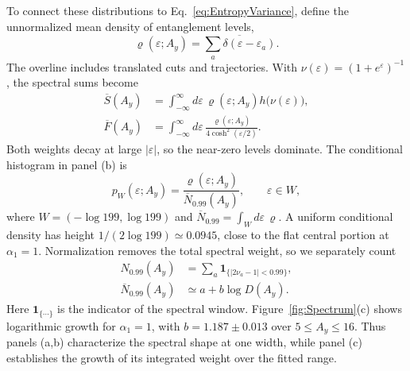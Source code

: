 \documentclass[aps,prb,10pt,twocolumn,superscriptaddress,longbibliography,floatfix]{revtex4-2}
\begin{document}
{To connect these distributions to Eq.~\eqref{eq:EntropyVariance}, define the unnormalized mean density of entanglement levels,
\begin{equation}
 \varrho(\varepsilon;A_y)=\overline{\sum_a\delta(\varepsilon-\varepsilon_a)}.
 \label{eq:EntanglementLevelDensity}
\end{equation}
The overline includes translated cuts and trajectories. With $\nu(\varepsilon)=(1+e^\varepsilon)^{-1}$, the spectral sums become
\begin{align}
 \overline S(A_y)&=\int_{-\infty}^{\infty}d\varepsilon\,
 \varrho(\varepsilon;A_y)h\bigl(\nu(\varepsilon)\bigr),\nonumber\\
 \overline F(A_y)&=\int_{-\infty}^{\infty}d\varepsilon\,
 \frac{\varrho(\varepsilon;A_y)}{4\cosh^2(\varepsilon/2)}.
 \label{eq:SpectralEntropyVariance}
\end{align}
Both weights decay at large $|\varepsilon|$, so the near-zero levels dominate. The conditional histogram in panel (b) is
\begin{equation}
 p_W(\varepsilon;A_y)=\frac{\varrho(\varepsilon;A_y)}{\overline N_{0.99}(A_y)},
 \qquad \varepsilon\in W,
 \label{eq:ConditionalSpectralDensity}
\end{equation}
where $W=(-\log199,\log199)$ and $\overline N_{0.99}=\int_Wd\varepsilon\,\varrho$. A uniform conditional density has height $1/(2\log199)\simeq0.0945$, close to the flat central portion at $\alpha_1=1$. Normalization removes the total spectral weight, so we separately count
\begin{align}
 N_{0.99}(A_y)&=\sum_a\mathbf1_{\{|2\nu_a-1|<0.99\}},\nonumber\\
 \overline N_{0.99}(A_y)&\simeq a+b\log D(A_y).
 \label{eq:WindowCount}
\end{align}
Here $\mathbf1_{\{\cdots\}}$ is the indicator of the spectral window. Figure~\ref{fig:Spectrum}(c) shows logarithmic growth for $\alpha_1=1$, with $b=1.187\pm0.013$ over $5\leq A_y\leq16$. Thus panels (a,b) characterize the spectral shape at one width, while panel (c) establishes the growth of its integrated weight over the fitted range.

}
\end{document}
